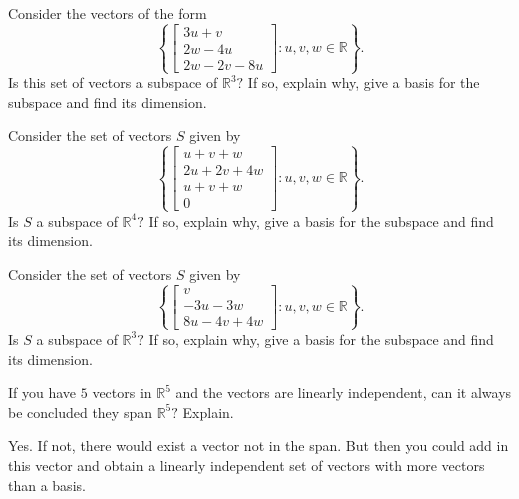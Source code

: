 \documentclass{ximera}
\begin{document}
\begin{problem}\label{prb:5.21} Consider the vectors of the form
\begin{equation*}
\left\{ \left[
\begin{array}{c}
3u+v \\
2w-4u \\
2w-2v-8u
\end{array}
\right] :u,v,w\in \mathbb{R}\right\} .
\end{equation*}
Is this set of vectors a subspace of $\mathbb{R}^{3}?$ If so, explain why,
give a basis for the subspace and find its dimension.
\end{problem}

\begin{problem}\label{prb:5.22} Consider the set of vectors $S$ given by
\begin{equation*}
\left\{ \left[
\begin{array}{c}
u+v+w \\
2u+2v+4w \\
u+v+w \\
0
\end{array}
\right] :u,v,w\in \mathbb{R}\right\} .
\end{equation*}
Is $S$ a subspace of $\mathbb{R}^{4}?$ If so, explain why,
give a basis for the subspace and find its dimension.
\end{problem}

\begin{problem}\label{prb:5.23} Consider the set of vectors $S$ given by
\begin{equation*}
\left\{ \left[
\begin{array}{c}
v \\
-3u-3w \\
8u-4v+4w
\end{array}
\right] :u,v,w\in \mathbb{R}\right\} .
\end{equation*}
Is $S$ a subspace of $\mathbb{R}^{3}?$ If so, explain why,
give a basis for the subspace and find its dimension.
\end{problem}

\begin{problem}\label{prb:5.24} If you have $5$ vectors in $\mathbb{R}^{5}$ and the vectors are
linearly independent, can it always be concluded they span $\mathbb{R}^{5}?$
Explain.
\begin{hint}
 Yes. If not, there would exist a vector not in the span. But then
you could add in this vector and obtain a linearly independent set of
vectors with more vectors than a basis.
\end{hint}
\end{problem}
\end{document}
